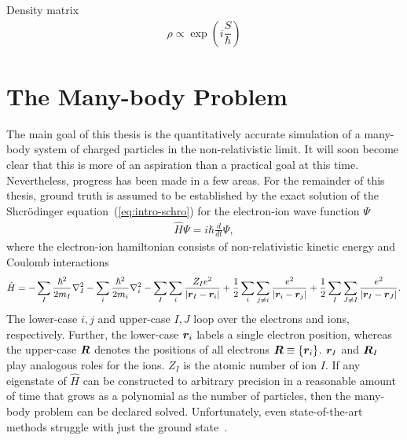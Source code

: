 Density matrix
\begin{align}
\rho\propto\exp\left(i\dfrac{S}{\hbar}\right)
\end{align}

\section{The Many-body Problem}
The main goal of this thesis is the quantitatively accurate simulation of a many-body system of charged particles in the non-relativistic limit.
It will soon become clear that this is more of an aspiration than a practical goal at this time.
Nevertheless, progress has been made in a few areas.
For the remainder of this thesis, ground truth is assumed to be established by the exact solution of the Shcr\"odinger equation~(\ref{eq:intro-schro}) for the electron-ion wave function $\Psi$
\begin{align} \label{eq:intro-schro}
\hat{H} \Psi = i\hbar\frac{d}{dt}\Psi,
\end{align}
where the electron-ion hamiltonian consists of non-relativistic kinetic energy and Coulomb interactions
\begin{align} \label{eq:intro-ei-ham}
\hat{H} =
-\sum_I \frac{\hbar^2}{2m_I} \nabla^2_I 
-\sum_i \frac{\hbar^2}{2m_i}\nabla^2_i
-\sum_I\sum_i\frac{Z_Ie^2}{\vert\boldsymbol{r}_I-\boldsymbol{r}_i\vert}
+\frac{1}{2}\sum_i\sum_{j\neq i} \frac{e^2}{\vert\boldsymbol{r}_i-\boldsymbol{r}_j\vert}
+\frac{1}{2}\sum_I\sum_{J\neq I} \frac{e^2}{\vert\boldsymbol{r}_I-\boldsymbol{r}_J\vert}.
\end{align}
The lower-case $i,j$ and upper-case $I,J$ loop over the electrons and ions, respectively. Further, the lower-case $\boldsymbol{r}_i$ labels a single electron position, whereas the upper-case $\boldsymbol{R}$ denotes the positions of all electrons $\boldsymbol{R}\equiv\{\boldsymbol{r}_i\}$. $\boldsymbol{r}_I$ and $\boldsymbol{R}_I$ play analogous roles for the ions. $Z_I$ is the atomic number of ion $I$. If any eigenstate of $\hat{H}$ can be constructed to arbitrary precision in a reasonable amount of time that grows as a polynomial as the number of particles, then the many-body problem can be declared solved. Unfortunately, even state-of-the-art methods struggle with just the ground state~\cite{Azadi2014,McMinis2015,Drummond2015}.

